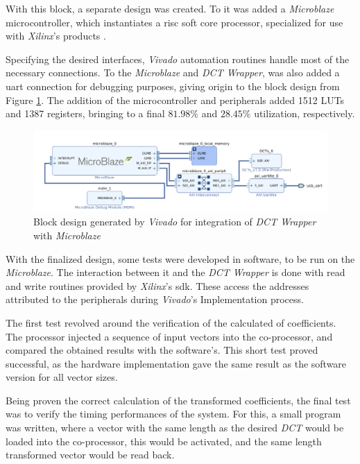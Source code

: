 
With this block, a separate design was created. To it was added a \emph{Microblaze} microcontroller, which instantiates a \gls{risc} soft core processor, specialized for use with \emph{Xilinx}'s products \cite{MicroBlazeProcessorReference2019a}. 

Specifying the desired interfaces, \emph{Vivado} automation routines handle most of the necessary connections. To the \emph{Microblaze} and \emph{DCT Wrapper}, was also added a \gls{uart} connection for debugging purposes, giving origin to the block design from Figure \ref{fig:blockdes}. The addition of the microcontroller and peripherals added 1512 LUTs and 1387 registers, bringing to a final $81.98\%$ and $28.45\%$ utilization, respectively.

\begin{figure}[htb]
    \centering
    \includegraphics[width=\textwidth]{Sections/4DevelopedArchitecture/Figures/DCTCop.png}
    \caption{Block design generated by \emph{Vivado} for integration of \emph{DCT Wrapper} with \emph{Microblaze}}
    \label{fig:blockdes}
\end{figure}

With the finalized design, some tests were developed in software, to be run on the \emph{Microblaze}. The interaction between it and the \emph{DCT Wrapper} is done with read and write routines provided by \emph{Xilinx}'s \gls{sdk}. These access the addresses attributed to the peripherals during \emph{Vivado}'s Implementation process.

The first test revolved around the verification of the calculated of coefficients. The processor injected a sequence of input vectors into the co-processor, and compared the obtained results with the software's. This short test proved successful, as the hardware implementation gave the same result as the software version for all vector sizes.

Being proven the correct calculation of the transformed coefficients, the final test was to verify the timing performances of the system. For this, a small program was written, where a vector with the same length as the desired \emph{DCT} would be loaded into the co-processor, this would be activated, and the same length transformed vector would be read back.

